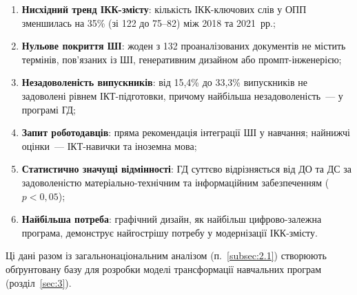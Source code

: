 \begin{enumerate}
    \item \textbf{Нисхідний тренд ІКК-змісту}: кількість ІКК-ключових слів у ОПП зменшилась на 35\% (зі 122 до 75--82) між 2018 та 2021~рр.;
    \item \textbf{Нульове покриття ШІ}: жоден з 132 проаналізованих документів не містить термінів, пов'язаних із ШІ, генеративним дизайном або промпт-інженерією;
    \item \textbf{Незадоволеність випускників}: від 15,4\% до 33,3\% випускників не задоволені рівнем ІКТ-підготовки, причому найбільша незадоволеність~--- у програмі ГД;
    \item \textbf{Запит роботодавців}: пряма рекомендація інтеграції ШІ у навчання; найнижчі оцінки~--- ІКТ-навички та іноземна мова;
    \item \textbf{Статистично значущі відмінності}: ГД суттєво відрізняється від ДО та ДС за задоволеністю матеріально-технічним та інформаційним забезпеченням ($p < 0{,}05$);
    \item \textbf{Найбільша потреба}: графічний дизайн, як найбільш цифрово-залежна програма, демонструє найгострішу потребу у модернізації ІКК-змісту.
\end{enumerate}

Ці дані разом із загальнонаціональним аналізом (п.~\ref{subsec:2.1}) створюють обґрунтовану базу для розробки моделі трансформації навчальних програм (розділ~\ref{sec:3}).
